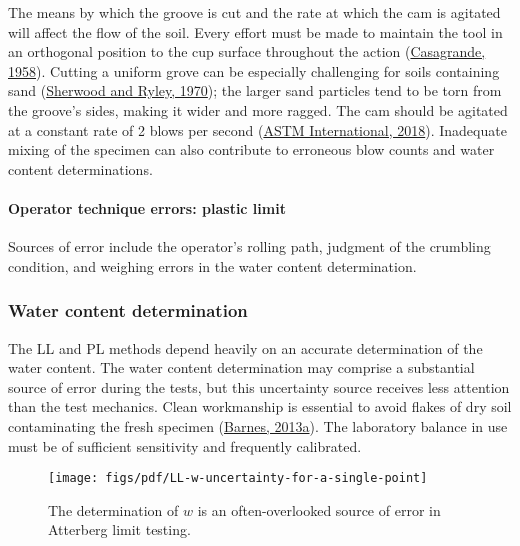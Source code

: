 \documentclass[
  letterpaper,
  openany]{book}
\begin{document}
The means by which the groove is cut and the rate at which the cam is agitated will affect the flow of the soil.
Every effort must be made to maintain the tool in an orthogonal position to the cup surface throughout the action (\protect\hyperlink{ref-Casagrande1958}{Casagrande, 1958}).
Cutting a uniform grove can be especially challenging for soils containing sand (\protect\hyperlink{ref-Sherwood1970a}{Sherwood and Ryley, 1970}); the larger sand particles tend to be torn from the groove's sides, making it wider and more ragged.
The cam should be agitated at a constant rate of 2 blows per second (\protect\hyperlink{ref-ASTMD43182018}{ASTM International, 2018}).
Inadequate mixing of the specimen can also contribute to erroneous blow counts and water content determinations.

\hypertarget{operator-technique-errors-plastic-limit}{%
\paragraph{Operator technique errors: plastic limit}\label{operator-technique-errors-plastic-limit}}

Sources of error include the operator's rolling path, judgment of the crumbling condition, and weighing errors in the water content determination.

\hypertarget{water-content-determination}{%
\subsubsection{Water content determination}\label{water-content-determination}}

The LL and PL methods depend heavily on an accurate determination of the water content.
The water content determination may comprise a substantial source of error during the tests, but this uncertainty source receives less attention than the test mechanics.
Clean workmanship is essential to avoid flakes of dry soil contaminating the fresh specimen (\protect\hyperlink{ref-Barnes2013}{Barnes, 2013a}).
The laboratory balance in use must be of sufficient sensitivity and frequently calibrated.

\begin{figure}

{\centering \texttt{[image: figs/pdf/LL-w-uncertainty-for-a-single-point]} 

}

\caption[Variability in $w$ determination during LL test]{The determination of $w$ is an often-overlooked source of error in Atterberg limit testing.}\label{fig:LL-w-determination-variability}
\end{figure}
\end{document}
